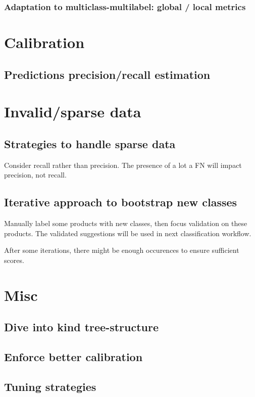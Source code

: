 \subsubsection{Adaptation to multiclass-multilabel: global / local metrics}



\section{Calibration}

\subsection{Predictions precision/recall estimation}

\section{Invalid/sparse data}

\subsection{Strategies to handle sparse data}
Consider recall rather than precision. The presence of a lot a FN will impact precision, not recall.

\subsection{Iterative approach to bootstrap new classes}
Manually label some products with new classes, then focus validation on these products. The validated suggestions will be used in next classification workflow.

After some iterations, there might be enough occurences to ensure sufficient scores.


\section{Misc}

\subsection{Dive into kind tree-structure}
\subsection{Enforce better calibration}
\subsection{Tuning strategies}
